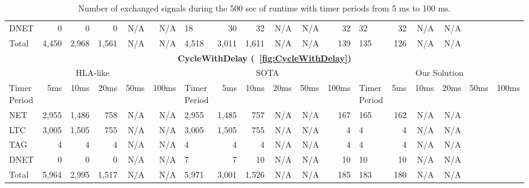 \begin{table*}
\begin{tabular}{|l|rrrrr||l|rrrrr||l|rrrrr|}
		DNET & 0 & 0 & 0 & N/A & N/A & 18 & 30 & 32 & N/A & N/A & 32 & 32 & 32 & N/A & N/A \\
		Total & 4,450 & 2,968 & 1,561 & N/A & N/A & 4,518 & 3,011 & 1,611 & N/A & N/A & 139 & 135 & 126 & N/A & N/A \\
		\hline
%
		\hline
		\hline
		\multicolumn{18}{|c|}{\textbf{CycleWithDelay (\figurename~\ref{fig:CycleWithDelay})}} \\
		\hline
		\multicolumn{6}{|c||}{HLA-like} & \multicolumn{6}{|c||}{SOTA} & \multicolumn{6}{|c|}{Our Solution} \\
		\hline
		Timer Period \hspace{-5pt} & 5ms & 10ms & 20ms & 50ms & 100ms & Timer Period \hspace{-5pt} & 5ms & 10ms & 20ms & 50ms & 100ms & Timer Period \hspace{-5pt} & 5ms & 10ms & 20ms & 50ms & 100ms \\
		\hline
		NET & 2,955 & 1,486 & 758 & N/A & N/A & 2,955 & 1,485 & 757 & N/A & N/A & 167 & 165 & 162 & N/A & N/A \\
		LTC & 3,005 & 1,505 & 755 & N/A & N/A & 3,005 & 1,505 & 755 & N/A & N/A & 4 & 4 & 4 & N/A & N/A \\
		TAG & 4 & 4 & 4 & N/A & N/A & 4 & 4 & 4 & N/A & N/A & 4 & 4 & 4 & N/A & N/A \\
		DNET & 0 & 0 & 0 & N/A & N/A & 7 & 7 & 10 & N/A & N/A & 10 & 10 & 10 & N/A & N/A \\
		Total & 5,964 & 2,995 & 1,517 & N/A & N/A & 5,971 & 3,001 & 1,526 & N/A & N/A & 185 & 183 & 180 & N/A & N/A \\
		\hline
	\end{tabular}
	
	\caption{Number of exchanged signals during the 500 sec of runtime with timer periods from 5 ms to 100 ms.}
	\label{tab:NumSignals}
\end{table*}